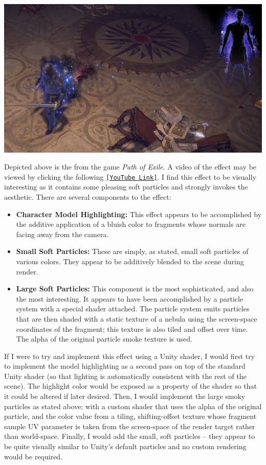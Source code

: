 \documentclass[11pt]{article}
\begin{document}
\begin{center}
	\includegraphics[width=\linewidth]{PoEFX.png}
\end{center}
Depicted above is the  from the game \textit{Path of Exile}. A video of the effect may be viewed by clicking the following \href{https://www.youtube.com/watch?v=tiFfWGNF_l8}{\texttt{[YouTube Link]}}. I find this effect to be visually interesting as it contains some pleasing soft particles and strongly invokes the  aesthetic. There are several components to the effect:

\begin{itemize}
	\item \textbf{Character Model Highlighting:} This effect appears to be accomplished by the additive application of a bluish color to fragments whose normals are facing away from the camera.
	\item \textbf{Small Soft Particles:} These are simply, as stated, small soft particles of various colors. They appear to be additively blended to the scene during render.
	\item \textbf{Large Soft Particles:} This component is the most sophisticated, and also the most interesting. It appears to have been accomplished by a particle system with a special shader attached. The particle system emits  particles that are then shaded with a static texture of a nebula using the screen-space coordinates of the fragment; this texture is also tiled and offset over time. The alpha of the original particle smoke texture is used.
\end{itemize}

If I were to try and implement this effect using a Unity shader, I would first try to implement the model highlighting as a second pass on top of the standard Unity shader (so that lighting is automatically consistent with the rest of the scene). The highlight color would be exposed as a property of the shader so that it could be altered if later desired. Then, I would implement the large smoky particles as stated above: with a custom shader that uses the alpha of the original particle, and the color value from a tiling, shifting-offset texture whose fragment sample UV parameter is taken from the screen-space of the render target rather than world-space. Finally, I would add the small, soft particles -- they appear to be quite visually similar to Unity's default particles and no custom rendering would be required.
\end{document}
